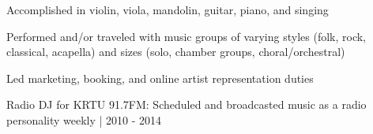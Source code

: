 \documentclass[letterpaper]{deedy-resume} %
\begin{document}
\begin{tightitemize}
\item Accomplished in violin, viola, mandolin, guitar, piano, and singing
\item Performed and/or traveled with music groups of varying styles (folk, rock, classical, acapella) and sizes (solo, chamber groups, choral/orchestral) 
\item Led marketing, booking, and online artist representation duties\\
\item Radio DJ for KRTU 91.7FM: Scheduled and broadcasted music as a radio personality weekly | 2010 - 2014
\end{tightitemize}







\sectionspace %










\end{document}

